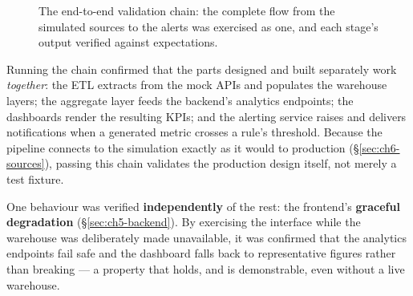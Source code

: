 \begin{figure}[H]
\centering
{}
\caption{The end-to-end validation chain: the complete flow from the simulated sources to the alerts was
exercised as one, and each stage's output verified against expectations.}
\label{fig:ch6-e2e}
\end{figure}

Running the chain confirmed that the parts designed and built separately work \emph{together}: the ETL
extracts from the mock APIs and populates the warehouse layers; the aggregate layer feeds the backend's
analytics endpoints; the dashboards render the resulting KPIs; and the alerting service raises and
delivers notifications when a generated metric crosses a rule's threshold. Because the pipeline connects
to the simulation exactly as it would to production (\S\ref{sec:ch6-sources}), passing this chain
validates the production design itself, not merely a test fixture.

One behaviour was verified \textbf{independently} of the rest: the frontend's
\textbf{graceful degradation} (\S\ref{sec:ch5-backend}). By exercising the interface while the warehouse
was deliberately made unavailable, it was confirmed that the analytics endpoints fail safe and the
dashboard falls back to representative figures rather than breaking --- a property that holds, and is
demonstrable, even without a live warehouse.

